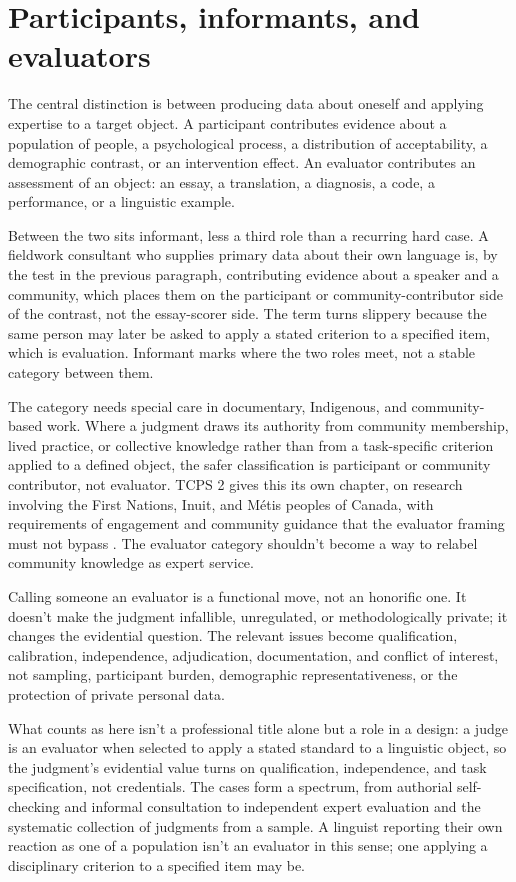 \section{Participants, informants, and evaluators}
\label{sec:role-distinction}

The central distinction is between producing data about oneself and applying expertise to a target object. A participant contributes evidence about a population of people, a psychological process, a distribution of acceptability, a demographic contrast, or an intervention effect. An evaluator contributes an assessment of an object: an essay, a translation, a diagnosis, a code, a performance, or a linguistic example.

Between the two sits informant, less a third role than a recurring hard case. A fieldwork consultant who supplies primary data about their own language is, by the test in the previous paragraph, contributing evidence about a speaker and a community, which places them on the participant or community-contributor side of the contrast, not the essay-scorer side. The term turns slippery because the same person may later be asked to apply a stated criterion to a specified item, which is evaluation. Informant marks where the two roles meet, not a stable category between them.

The category needs special care in documentary, Indigenous, and community-based work. Where a judgment draws its authority from community membership, lived practice, or collective knowledge rather than from a task-specific criterion applied to a defined object, the safer classification is participant or community contributor, not evaluator. TCPS 2 gives this its own chapter, on research involving the First Nations, Inuit, and Métis peoples of Canada, with requirements of engagement and community guidance that the evaluator framing must not bypass \citep[Chapter~9]{tcps2_2022}. The evaluator category shouldn't become a way to relabel community knowledge as expert service.

Calling someone an evaluator is a functional move, not an honorific one. It doesn't make the judgment infallible, unregulated, or methodologically private; it changes the evidential question. The relevant issues become qualification, calibration, independence, adjudication, documentation, and conflict of interest, not sampling, participant burden, demographic representativeness, or the protection of private personal data.

What counts as  here isn't a professional title alone but a role in a design: a judge is an evaluator when selected to apply a stated standard to a linguistic object, so the judgment's evidential value turns on qualification, independence, and task specification, not credentials. The cases form a spectrum, from authorial self-checking and informal consultation to independent expert evaluation and the systematic collection of judgments from a sample. A linguist reporting their own reaction as one of a population isn't an evaluator in this sense; one applying a disciplinary criterion to a specified item may be.

